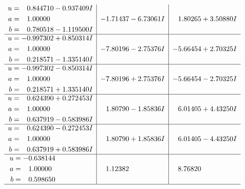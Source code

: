 \documentclass[1p]{elsarticle_modified}
\theoremstyle{definition}
\begin{document}
$$\begin{array}{c|c|c}
\begin{aligned}
u &= \phantom{-}0.844710 - 0.937409 I \\
a &= \phantom{-}1.00000\phantom{ +0.000000I} \\
b &= \phantom{-}0.780518 - 1.119500 I\end{aligned}
 & -1.71437 - 6.73061 I & \phantom{-}1.80265 + 3.50880 I \\ \hline\begin{aligned}
u &= -0.997302 + 0.850314 I \\
a &= \phantom{-}1.00000\phantom{ +0.000000I} \\
b &= \phantom{-}0.218571 - 1.335140 I\end{aligned}
 & -7.80196 - 2.75376 I & -5.66454 + 2.70325 I \\ \hline\begin{aligned}
u &= -0.997302 - 0.850314 I \\
a &= \phantom{-}1.00000\phantom{ +0.000000I} \\
b &= \phantom{-}0.218571 + 1.335140 I\end{aligned}
 & -7.80196 + 2.75376 I & -5.66454 - 2.70325 I \\ \hline\begin{aligned}
u &= \phantom{-}0.624390 + 0.272453 I \\
a &= \phantom{-}1.00000\phantom{ +0.000000I} \\
b &= \phantom{-}0.637919 - 0.583986 I\end{aligned}
 & \phantom{-}1.80790 - 1.85836 I & \phantom{-}6.01405 + 4.43250 I \\ \hline\begin{aligned}
u &= \phantom{-}0.624390 - 0.272453 I \\
a &= \phantom{-}1.00000\phantom{ +0.000000I} \\
b &= \phantom{-}0.637919 + 0.583986 I\end{aligned}
 & \phantom{-}1.80790 + 1.85836 I & \phantom{-}6.01405 - 4.43250 I \\ \hline\begin{aligned}
u &= -0.638144\phantom{ +0.000000I} \\
a &= \phantom{-}1.00000\phantom{ +0.000000I} \\
b &= \phantom{-}0.598650\phantom{ +0.000000I}\end{aligned}
 & \phantom{-}1.12382\phantom{ +0.000000I} & \phantom{-}8.76820\phantom{ +0.000000I}\\
 \hline 
 \end{array}$$\newpage$$\begin{array}{c|c|c}  

\end{array}$$
\end{document}
